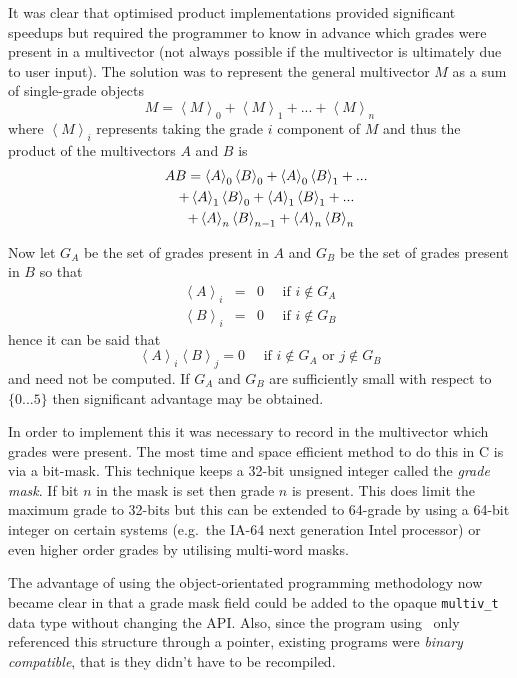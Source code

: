 It was clear that optimised product implementations provided significant speedups but
required the programmer to know in advance which grades were present in a 
multivector (not always possible if the multivector is ultimately due to
user input). The solution was to represent the general multivector $M$
as a sum of single-grade objects
\[
M = \left<M\right>_0 + \left<M\right>_1 + ... + \left<M\right>_n
\]
where $\left<M\right>_i$ represents taking the grade $i$ component of $M$ and thus
the product of the multivectors $A$ and $B$ is
\begin{eqnarray*}
\lefteqn{AB = \left<A\right>_0\left<B\right>_0 + \left<A\right>_0\left<B\right>_1 + ...} \\
   && + \left<A\right>_1\left<B\right>_0 + \left<A\right>_1\left<B\right>_1 + ...  \\
   && + \left<A\right>_n\left<B\right>_{n-1} + \left<A\right>_n\left<B\right>_n
\end{eqnarray*}

Now let $G_A$ be the set of grades present in $A$ and $G_B$ be the set of grades present
in $B$ so that
\begin{eqnarray*}
\left<A\right>_i & = & 0 \quad \mbox{ if } i \notin G_A \\
\left<B\right>_i & = & 0 \quad \mbox{ if } i \notin G_B
\end{eqnarray*}
hence it can be said that
\[
\left<A\right>_i\left<B\right>_j = 0 \quad \mbox{ if } i \notin G_A \mbox{ or } j \notin G_B
\]
and need not be computed. If $G_A$ and $G_B$ are sufficiently small with respect to
$\{0 ... 5\}$ then significant advantage may be obtained.

In order to implement this it was necessary to record in the multivector which
grades were present. The most time and space efficient method to do this in
C is via a bit-mask. This technique keeps a 32-bit unsigned integer called the
\emph{grade mask}. If bit $n$ in the mask is set then grade $n$ is present. 
This does limit the maximum grade to 32-bits but this can be extended to 64-grade
by using a 64-bit integer on certain systems (e.g.\ the IA-64 next generation
Intel processor) or even higher order grades by utilising multi-word masks.

The advantage of using the object-orientated programming methodology now
became clear in that a grade mask field could be added to the opaque
\texttt{multiv\_t} data type without changing the API. Also, since the 
program using \libcga\ only referenced this structure through a pointer,
existing programs were \emph{binary compatible}, that is they didn't have to be
recompiled.

